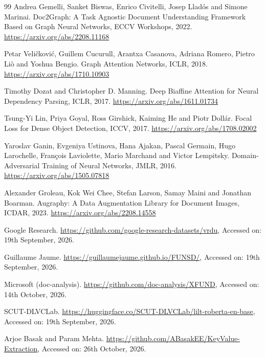 \documentclass[11pt,a4paper]{article}
\begin{document}
\begin{thebibliography}{99}
 Andrea Gemelli, Sanket Biswas, Enrico Civitelli, Josep Llad\'os and Simone Marinai. Doc2Graph: A Task Agnostic Document Understanding Framework Based on Graph Neural Networks, ECCV Workshops, 2022. \url{https://arxiv.org/abs/2208.11168}

 Petar Veli\v{c}kovi\'c, Guillem Cucurull, Arantxa Casanova, Adriana Romero, Pietro Li\`o and Yoshua Bengio. Graph Attention Networks, ICLR, 2018. \url{https://arxiv.org/abs/1710.10903}

 Timothy Dozat and Christopher D. Manning. Deep Biaffine Attention for Neural Dependency Parsing, ICLR, 2017. \url{https://arxiv.org/abs/1611.01734}

 Tsung-Yi Lin, Priya Goyal, Ross Girshick, Kaiming He and Piotr Doll\'ar. Focal Loss for Dense Object Detection, ICCV, 2017. \url{https://arxiv.org/abs/1708.02002}

 Yaroslav Ganin, Evgeniya Ustinova, Hana Ajakan, Pascal Germain, Hugo Larochelle, Fran\c{c}ois Laviolette, Mario Marchand and Victor Lempitsky. Domain-Adversarial Training of Neural Networks, JMLR, 2016. \url{https://arxiv.org/abs/1505.07818}

 Alexander Groleau, Kok Wei Chee, Stefan Larson, Samay Maini and Jonathan Boarman. Augraphy: A Data Augmentation Library for Document Images, ICDAR, 2023. \url{https://arxiv.org/abs/2208.14558}

 Google Research. \url{https://github.com/google-research-datasets/vrdu}, Accessed on: 19th September, 2026.

 Guillaume Jaume. \url{https://guillaumejaume.github.io/FUNSD/}, Accessed on: 19th September, 2026.

 Microsoft (doc-analysis). \url{https://github.com/doc-analysis/XFUND}, Accessed on: 14th October, 2026.

 SCUT-DLVCLab. \url{https://huggingface.co/SCUT-DLVCLab/lilt-roberta-en-base}, Accessed on: 19th September, 2026.

 Arjoe Basak and Param Mehta. \url{https://github.com/ABasakEE/KeyValue-Extraction}, Accessed on: 26th October, 2026.

\end{thebibliography}
\end{document}
